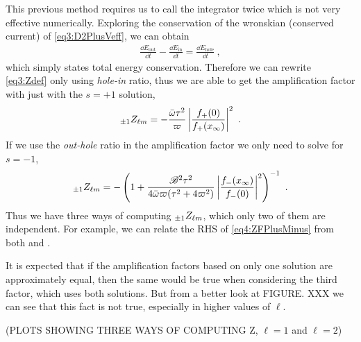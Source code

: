 This previous method requires us to call the integrator twice which is not very effective numerically.
Exploring the conservation of the wronskian (conserved current) of \eqref{eq3:D2PlusVeff}, we can obtain
\begin{align}
	\frac{\dd E_\mathrm{out}}{\dd t} - \frac{\dd E_\mathrm{in}}{\dd t} = \frac{\dd E_\mathrm{hole}}{\dd t} ~,
\end{align}
which simply states total energy conservation.
Therefore we can rewrite \eqref{eq3:Zdef} only using \emph{hole-in} ratio, thus we are able to get the amplification factor with just with the $s=+1$ solution,
\begin{align}
	\label{eq4:ZFPlusPlus}
	\uu[\pm 1]{Z}{\ell m} = - \frac{\bar{\omega} \tau^2}{\varpi} \left|\frac{f_{+}(0)}{f_{+}(x_\infty)}\right|^2 ~.
\end{align}
If we use the \emph{out-hole} ratio in the amplification factor we only need to solve for $s=-1$,
\begin{align}
	\label{eq4:ZFMinusMinus}
	\uu[\pm 1]{Z}{\ell m} = - \left( 1 + \frac{\mathscr{B}^2 \tau^2}{4 \bar{\omega} \varpi(\tau^2 + 4 \varpi^2)} \left|\frac{f_{-}(x_\infty)}{f_{-}(0)}\right|^2 \right)^{-1} ~.
\end{align}
Thus we have three ways of computing $\uu[\pm 1]{Z}{\ell m}$, which only two of them are independent.
For example, we can relate the RHS of \eqref{eq4:ZFPlusMinus} from both  and .

It is expected that if the amplification factors based on only one solution are approximately equal, then the same would be true when considering the third factor, which uses both solutions.
But from a better look at FIGURE. XXX we can see that this fact is not true, especially in higher values of $\ell$.

(PLOTS SHOWING THREE WAYS OF COMPUTING Z, $\ell=1$ and $\ell=2$)

